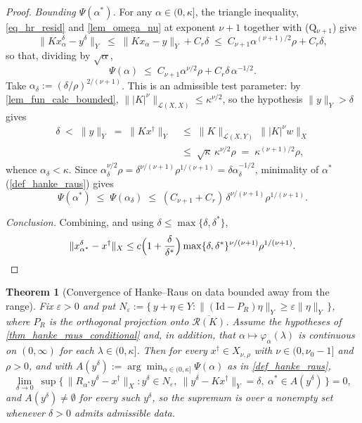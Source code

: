 \documentclass[a4paper]{report}
\theoremstyle{plain}
\newtheorem{theorem}{Theorem}[chapter]
\theoremstyle{definition}
\theoremstyle{remark}
\newcommand{\Ll}{\mathcal{L}}
\newcommand{\Ran}{\mathcal{R}}
\newcommand{\Id}{\mathrm{Id}}
\newcommand{\dg}{^{\dagger}}
\begin{document}
\begin{proof}
  \emph{Bounding $\Psi(\alpha^{*})$.}  For any $\alpha \in (0,\kappa]$, the triangle
  inequality, \eqref{eq_hr_resid} and \cref{lem_omega_nu} at exponent $\nu+1$ together
  with (Q$_{\nu+1}$) give
  \[
    \|Kx^{\delta}_{\alpha} - y^{\delta}\|_Y \;\le\; \|Kx_{\alpha} - y\|_Y + C_r\delta
      \;\le\; C_{\nu+1}\alpha^{(\nu+1)/2}\rho + C_r\delta ,
  \]
  so that, dividing by $\sqrt{\alpha}$,
  \[
    \Psi(\alpha) \;\le\; C_{\nu+1}\alpha^{\nu/2}\rho + C_r\delta\,\alpha^{-1/2} .
  \]
  Take $\alpha_{\delta} := (\delta/\rho)^{2/(\nu+1)}$.  This is an admissible test
  parameter: by \cref{lem_fun_calc_bounded}, $\||K|^{\nu}\|_{\Ll(X,X)} \le \kappa^{\nu/2}$,
  so the hypothesis $\|y\|_Y > \delta$ gives
  \[
    \begin{aligned}
      \delta \;<\; \|y\|_Y \;=\; \|Kx\dg\|_Y
        &\;\le\; \|K\|_{\Ll(X,Y)}\,\bigl\||K|^{\nu}w\bigr\|_X \\
        &\;\le\; \sqrt{\kappa}\,\kappa^{\nu/2}\rho \;=\; \kappa^{(\nu+1)/2}\rho ,
    \end{aligned}
  \]
  whence $\alpha_{\delta} < \kappa$.   Since $\alpha_{\delta}^{\nu/2}\rho =
  \delta^{\nu/(\nu+1)}\rho^{1/(\nu+1)} = \delta\alpha_{\delta}^{-1/2}$, minimality of
  $\alpha^{*}$ (\cref{def_hanke_raus}) gives
  \[
    \Psi(\alpha^{*}) \;\le\; \Psi(\alpha_{\delta}) \;\le\;
      (C_{\nu+1} + C_r)\,\delta^{\nu/(\nu+1)}\rho^{1/(\nu+1)} .
  \]

  \emph{Conclusion.}  Combining, and using $\delta \le \max\{\delta,\delta^{*}\}$,
  \[
    \|x^{\delta}_{\alpha^{*}} - x\dg\|_X \le c\Bigl(1 + \frac{\delta}{\delta^{*}}\Bigr)
      \max\{\delta,\delta^{*}\}^{\nu/(\nu+1)}\rho^{1/(\nu+1)} . \qedhere
  \]
\end{proof}


\begin{theorem}[Convergence of Hanke--Raus on data bounded away from the range]
  \label{thm_hanke_raus_convergence}
  Fix $\varepsilon > 0$ and put
  $N_{\varepsilon} := \{\, y + \eta \in Y : \|(\Id - P_R)\eta\|_Y \ge \varepsilon
  \|\eta\|_Y \,\}$, where $P_R$ is the orthogonal projection onto
  $\overline{\Ran(K)}$.  Assume the hypotheses of \cref{thm_hanke_raus_conditional} and,
  in addition, that $\alpha \mapsto \varphi_{\alpha}(\lambda)$ is continuous on
  $(0,\infty)$ for each $\lambda \in (0,\kappa]$.  Then for every $x\dg \in X_{\nu,\rho}$
  with $\nu \in (0,\nu_0-1]$ and $\rho > 0$, and with $A(y^{\delta}) :=
  \arg\min_{\alpha \in (0,\kappa]}\Psi(\alpha)$ as in \cref{def_hanke_raus},
  \[
    \lim_{\delta \to 0}\ \sup\bigl\{\,\|R_{\alpha^{*}}y^{\delta} - x\dg\|_X :
      y^{\delta} \in N_{\varepsilon},\ \|y^{\delta} - Kx\dg\|_Y = \delta,\
      \alpha^{*} \in A(y^{\delta})\,\bigr\} = 0 ,
  \]
  and $A(y^{\delta}) \ne \emptyset$ for every such $y^{\delta}$, so the supremum is over
  a nonempty set whenever $\delta > 0$ admits admissible data.
\end{theorem}
\end{document}
